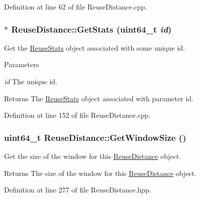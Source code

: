 Definition at line 62 of file ReuseDistance.cpp.

\hypertarget{class_reuse_distance_a771580c25dc5140969919e959e2ebdd1}{
\subsubsection[{GetStats}]{ $\ast$ ReuseDistance::GetStats (uint64\_\-t {\em id})}}
\label{class_reuse_distance_a771580c25dc5140969919e959e2ebdd1}
Get the \hyperlink{class_reuse_stats}{ReuseStats} object associated with some unique id.


\begin{DoxyParams}{Parameters}
\item[{\em id}]The unique id.\end{DoxyParams}
\begin{DoxyReturn}{Returns}
The \hyperlink{class_reuse_stats}{ReuseStats} object associated with parameter id. 
\end{DoxyReturn}


Definition at line 152 of file ReuseDistance.cpp.

\hypertarget{class_reuse_distance_a174706aa3697f068cc4d1534948d7786}{
\subsubsection[{GetWindowSize}]{\setlength{\rightskip}{0pt plus 5cm}uint64\_\-t ReuseDistance::GetWindowSize ()}}
\label{class_reuse_distance_a174706aa3697f068cc4d1534948d7786}
Get the size of the window for this \hyperlink{class_reuse_distance}{ReuseDistance} object.

\begin{DoxyReturn}{Returns}
The size of the window for this \hyperlink{class_reuse_distance}{ReuseDistance} object. 
\end{DoxyReturn}


Definition at line 277 of file ReuseDistance.hpp.

